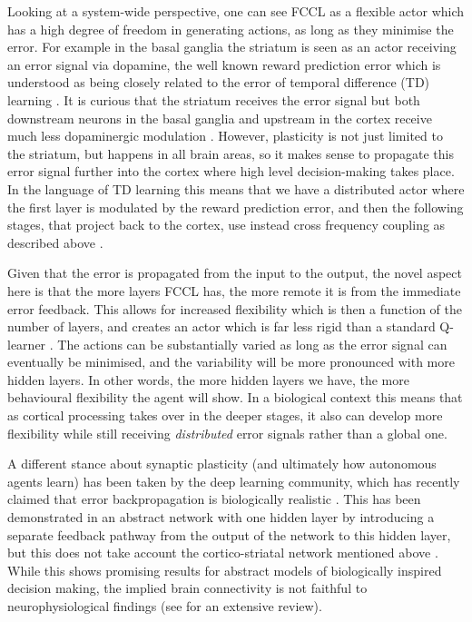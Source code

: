 \documentclass[Afour,sageh,times]{sagej}
\begin{document}
Looking at a system-wide perspective, one can see FCCL as a flexible
actor which has a high degree of freedom in generating actions, as long as they
minimise the error. For example in the basal ganglia the striatum is
seen as an actor receiving an error signal via dopamine, the well known
reward prediction error \cite{Schultz97} which is understood as being
closely related to the error of temporal difference (TD) learning
\cite{gurney98:_basal_gangl_action_selec_devic}. It is curious that
the striatum receives the error signal but both downstream neurons in
the basal ganglia and upstream in the cortex receive much less
dopaminergic modulation \cite{Beckstead1979}. However, plasticity is
not just limited to the striatum, but happens in all brain areas, so
it makes sense to propagate this error signal further into the cortex
\cite{Groenewegen1993} where high level decision-making takes place.
In the language of TD learning \cite{Sutton87} this means that we
have a distributed actor where the first layer is modulated by the
reward prediction error, and then the following stages, that project
back to the cortex, use instead cross frequency coupling
as described above \cite{Lipski2017}.

Given that the error is propagated from the input to the output, the
novel aspect here is that the more layers FCCL has, the more remote it
is from the immediate error feedback. This allows for increased
flexibility which is then a function of the number of layers, and
creates an actor which is far less rigid than a standard Q-learner
\cite{Dayan1992}. The actions can be substantially varied as long as
the error signal can eventually be minimised, and the variability will
be more pronounced with more hidden layers. In other words, the more
hidden layers we have, the more behavioural flexibility the agent will
show. In a biological context this means that as cortical processing
takes over in the deeper stages, it also can develop more flexibility
while still receiving \textsl{distributed} error signals rather than a
global one.

A different stance about synaptic plasticity (and ultimately how
autonomous agents learn) has been taken by the deep learning
community, which has recently claimed that error backpropagation is
biologically realistic \cite{Lillicrap2016,Roelfsema2018}. This has
been demonstrated in an abstract network with one hidden layer by
introducing a separate feedback pathway from the output of the network
to this hidden layer, but this does not take account the
cortico-striatal network mentioned above \cite{haber95}. While this
shows promising results for abstract models of biologically inspired
decision making, the implied brain connectivity is not faithful to
neurophysiological findings (see \cite{berthoud04} for an extensive
review).
\end{document}
